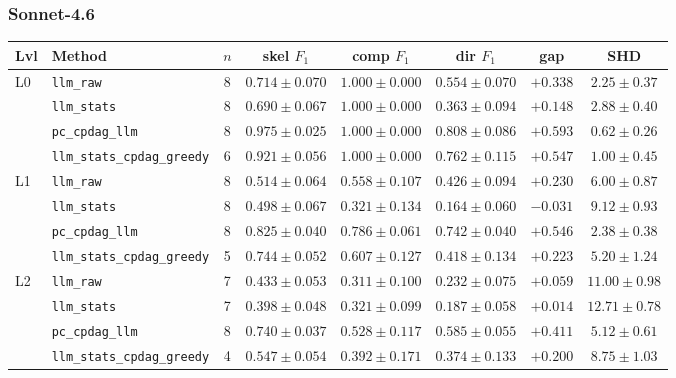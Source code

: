 \subsubsection{Sonnet-4.6}
\label{app:results:sonnet46}

\begin{center}
\scriptsize
\setlength{\tabcolsep}{3.0pt}
\begin{tabular}{@{}l l c c c c c c@{}}
\toprule
Lvl & Method & $n$ & skel $F_1$ & comp $F_1$ & dir $F_1$ & gap & SHD \\
\midrule
L0 & \texttt{llm\_raw}                & 8 & $0.714 \pm 0.070$ & $1.000 \pm 0.000$ & $0.554 \pm 0.070$ & $+0.338$ & $2.25 \pm 0.37$ \\
   & \texttt{llm\_stats}              & 8 & $0.690 \pm 0.067$ & $1.000 \pm 0.000$ & $0.363 \pm 0.094$ & $+0.148$ & $2.88 \pm 0.40$ \\
   & \texttt{pc\_cpdag\_llm}          & 8 & $0.975 \pm 0.025$ & $1.000 \pm 0.000$ & $0.808 \pm 0.086$ & $+0.593$ & $0.62 \pm 0.26$ \\
   & \texttt{llm\_stats\_cpdag\_greedy} & 6 & $0.921 \pm 0.056$ & $1.000 \pm 0.000$ & $0.762 \pm 0.115$ & $+0.547$ & $1.00 \pm 0.45$ \\
\midrule
L1 & \texttt{llm\_raw}                & 8 & $0.514 \pm 0.064$ & $0.558 \pm 0.107$ & $0.426 \pm 0.094$ & $+0.230$ & $6.00 \pm 0.87$ \\
   & \texttt{llm\_stats}              & 8 & $0.498 \pm 0.067$ & $0.321 \pm 0.134$ & $0.164 \pm 0.060$ & $-0.031$ & $9.12 \pm 0.93$ \\
   & \texttt{pc\_cpdag\_llm}          & 8 & $0.825 \pm 0.040$ & $0.786 \pm 0.061$ & $0.742 \pm 0.040$ & $+0.546$ & $2.38 \pm 0.38$ \\
   & \texttt{llm\_stats\_cpdag\_greedy} & 5 & $0.744 \pm 0.052$ & $0.607 \pm 0.127$ & $0.418 \pm 0.134$ & $+0.223$ & $5.20 \pm 1.24$ \\
\midrule
L2 & \texttt{llm\_raw}                & 7 & $0.433 \pm 0.053$ & $0.311 \pm 0.100$ & $0.232 \pm 0.075$ & $+0.059$ & $11.00 \pm 0.98$ \\
   & \texttt{llm\_stats}              & 7 & $0.398 \pm 0.048$ & $0.321 \pm 0.099$ & $0.187 \pm 0.058$ & $+0.014$ & $12.71 \pm 0.78$ \\
   & \texttt{pc\_cpdag\_llm}          & 8 & $0.740 \pm 0.037$ & $0.528 \pm 0.117$ & $0.585 \pm 0.055$ & $+0.411$ & $5.12 \pm 0.61$ \\
   & \texttt{llm\_stats\_cpdag\_greedy} & 4 & $0.547 \pm 0.054$ & $0.392 \pm 0.171$ & $0.374 \pm 0.133$ & $+0.200$ & $8.75 \pm 1.03$ \\

\end{tabular}
\end{center}
